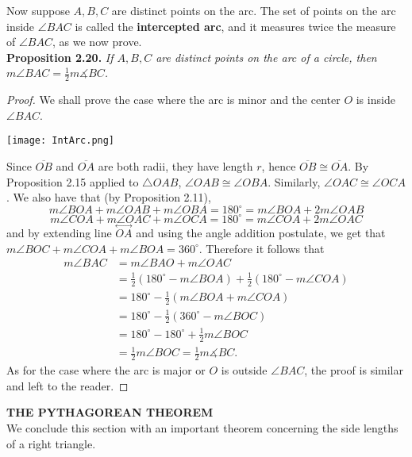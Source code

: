 \documentclass[leqno]{book}
\begin{document}
Now suppose $A,B,C$ are distinct points on the arc.  The set of points on the arc inside $\angle BAC$ is called the \textbf{intercepted arc}, and it measures twice the measure of $\angle BAC$, as we now prove.\\

\noindent\textbf{Proposition 2.20.} \emph{If $A,B,C$ are distinct points on the arc of a circle, then $m\angle BAC=\frac 12m\measuredangle BC$.}
\begin{proof}
We shall prove the case where the arc is minor and the center $O$ is inside $\angle BAC$.
\begin{center}\texttt{[image: IntArc.png]}\end{center}
Since $\overline{OB}$ and $\overline{OA}$ are both radii, they have length $r$, hence $\overline{OB}\cong\overline{OA}$.  By Proposition 2.15 applied to $\triangle OAB$, $\angle OAB\cong\angle OBA$.  Similarly, $\angle OAC\cong\angle OCA$.  We also have that (by Proposition 2.11), 
$$m\angle BOA+m\angle OAB+m\angle OBA=180^\circ=m\angle BOA+2m\angle OAB$$
$$m\angle COA+m\angle OAC+m\angle OCA=180^\circ=m\angle COA+2m\angle OAC$$
and by extending line $\overset{\longleftrightarrow}{OA}$ and using the angle addition postulate, we get that $m\angle BOC+m\angle COA+m\angle BOA=360^\circ$.  Therefore it follows that
\begin{align*}
m\angle BAC & = m\angle BAO+m\angle OAC \\
& = \frac 12(180^\circ-m\angle BOA)+\frac 12(180^\circ-m\angle COA)\\
& = 180^\circ - \frac 12(m\angle BOA+m\angle COA)\\
& = 180^\circ - \frac 12(360^\circ - m\angle BOC)\\
& = 180^\circ - 180^\circ + \frac 12m\angle BOC\\
& = \frac 12m\angle BOC=\frac 12m\measuredangle BC.
\end{align*}
As for the case where the arc is major or $O$ is outside $\angle BAC$, the proof is similar and left to the reader.
\end{proof}

\noindent\textbf{THE PYTHAGOREAN THEOREM}\\

\noindent We conclude this section with an important theorem concerning the side lengths of a right triangle.\\
\end{document}
